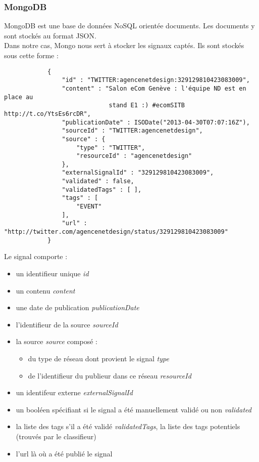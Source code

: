         \subsubsection{MongoDB} %
        \label{ssub:mongodb}
            MongoDB est une base de données NoSQL orientée documents. Les documents y sont stockés au format JSON.\\
            Dans notre cas, Mongo nous sert à stocker les signaux captés. Ils sont stockés sous cette forme :
            \begin{verbatim}
            {
                "id" : "TWITTER:agencenetdesign:329129810423083009",
                "content" : "Salon eCom Genève : l'équipe ND est en place au
                             stand E1 :) #ecomSITB http://t.co/YtsEs6rcDR",
                "publicationDate" : ISODate("2013-04-30T07:07:16Z"),
                "sourceId" : "TWITTER:agencenetdesign",
                "source" : {
                    "type" : "TWITTER",
                    "resourceId" : "agencenetdesign"
                },
                "externalSignalId" : "329129810423083009",
                "validated" : false,
                "validatedTags" : [ ],
                "tags" : [
                    "EVENT"
                ],
                "url" : "http://twitter.com/agencenetdesign/status/329129810423083009"
            }
            \end{verbatim}
            Le signal comporte :
            \begin{itemize}
                \item un identifieur unique \textit{id}
                \item un contenu \textit{content}
                \item une date de publication \textit{publicationDate}
                \item l'identifieur de la source \textit{sourceId}
                \item la source \textit{source} composé :
                \begin{itemize}
                    \item du type de réseau dont provient le signal \textit{type}
                    \item de l'identifieur du publieur dans ce réseau \textit{resourceId}
                \end{itemize}
                \item un identifeur externe \textit{externalSignalId}
                \item un booléen spécifiant si le signal a été manuellement validé ou non \textit{validated}
                \item la liste des tags s'il a été validé \textit{validatedTags}, la liste des tags potentiels (trouvés par le classifieur)
                \item l'url là où a été publié le signal
            \end{itemize}


